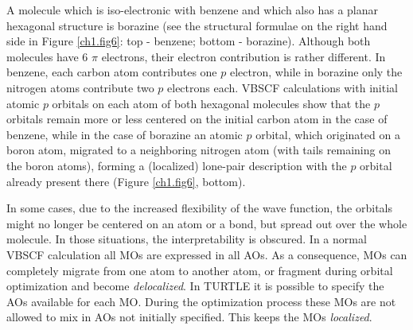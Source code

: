A molecule which is iso-electronic with benzene and which also has a planar hexagonal structure is borazine (see the structural formulae on the right hand side in Figure \ref{ch1.fig6}: top - benzene; bottom - borazine). Although both molecules have 6 $\pi$ electrons, their electron contribution is rather different. In benzene, each carbon atom contributes one $p$ electron, while in borazine only the nitrogen atoms contribute two $p$ electrons each. VBSCF calculations with initial atomic $p$ orbitals on each atom of both hexagonal molecules show that the $p$ orbitals remain more or less centered on the initial carbon atom in the case of benzene,  while in the case of borazine an atomic $p$ orbital, which originated on a boron atom, migrated to a neighboring nitrogen atom (with tails remaining on the boron atoms), forming a (localized) lone-pair description with the $p$ orbital already present there (Figure \ref{ch1.fig6}, bottom).

In some cases, due to the increased flexibility of the wave function, the orbitals might no longer be centered on an atom or a bond, but spread out over the whole molecule. In those situations, the interpretability is obscured. In a normal VBSCF calculation all MOs are expressed in all AOs. As a consequence, MOs can completely migrate from one atom to another atom, or fragment during orbital optimization and become \textit{delocalized}. In TURTLE it is possible to specify the AOs available for each MO. During the optimization process these MOs are not allowed to mix in AOs not initially specified. This keeps the MOs \textit{localized}. 

